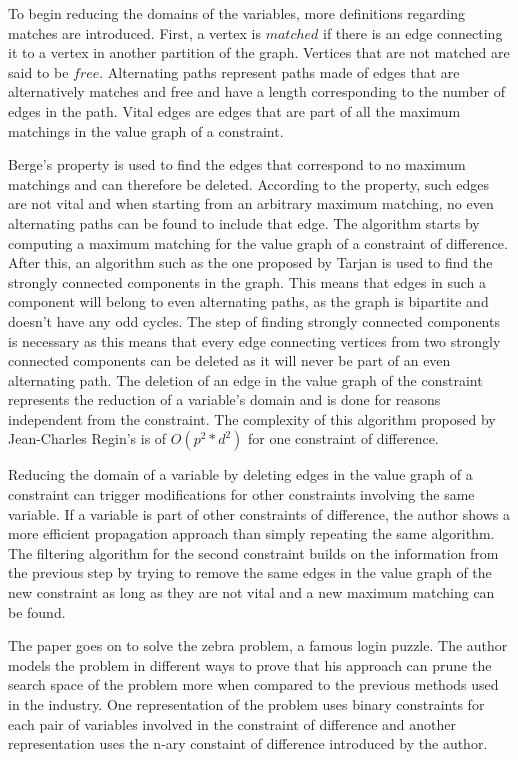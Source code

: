 \documentclass{l4proj}
\begin{document}
\noindent To begin reducing the domains of the variables, more definitions regarding matches are introduced. First, a vertex is $matched$ if there is an edge connecting it to a vertex in another partition of the graph. Vertices that are not matched are said to be $free$. Alternating paths represent paths made of edges that are alternatively matches and free and have a length corresponding to the number of edges in the path. Vital edges are edges that are part of all the maximum matchings in the value graph of a constraint.

\noindent Berge’s property \cite{berge1957two} is used to find the edges that correspond to no maximum matchings and can therefore be deleted. According to the property, such edges are not vital and when starting from an arbitrary maximum matching, no even alternating paths can be found to include that edge. The algorithm starts by computing a maximum matching for the value graph of a constraint of difference. After this, an algorithm such as the one proposed by Tarjan is used to find the strongly connected components in the graph. This means that edges in such a component will belong to even alternating paths, as the graph is bipartite and doesn’t have any odd cycles. The step of finding strongly connected components is necessary as this means that every edge connecting vertices from two strongly connected components can be deleted as it will never be part of an even alternating path. The deletion of an edge in the value graph of the constraint represents the reduction of a variable’s domain and is done for reasons independent from the constraint. The complexity of this algorithm proposed by Jean-Charles Regin’s is of $O(p^2 * d^2)$ for one constraint of difference.

\noindent Reducing the domain of a variable by deleting edges in the value graph of a constraint can trigger modifications for other constraints involving the same variable. If a variable is part of other constraints of difference, the author shows a more efficient propagation approach than simply repeating the same algorithm. The filtering algorithm for the second constraint builds on the information from the previous step by trying to remove the same edges in the value graph of the new constraint as long as they are not vital and a new maximum matching can be found.

\noindent The paper goes on to solve the zebra problem, a famous login puzzle. The author models the problem in different ways to prove that his approach can prune the search space of the problem more when compared to the previous methods used in the industry. One representation of the problem uses binary constraints for each pair of variables involved in the constraint of difference and another representation uses the n-ary constaint of difference introduced by the author. 
\end{document}
